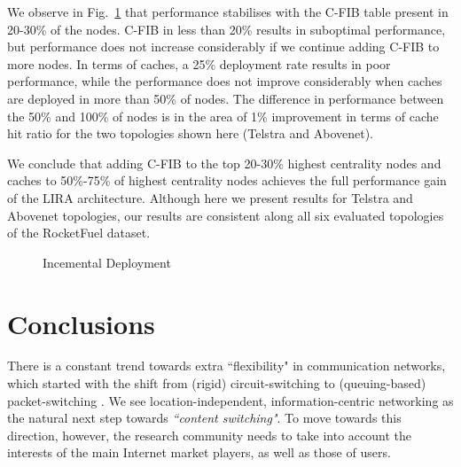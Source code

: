 \documentclass{sig-alternate}
\begin{document}
We observe in Fig.~\ref{fig:incremental-deployment} that performance stabilises with the C-FIB table present in 20-30\% of the nodes. C-FIB in less than 20\% results in suboptimal performance, but performance does not increase considerably if we continue adding C-FIB to more nodes. In terms of caches, a 25\% deployment rate results in poor performance, while the performance does not improve considerably when caches are deployed in more than 50\% of nodes. The difference in performance between the 50\% and 100\% of nodes is in the area of 1\% improvement in terms of cache hit ratio for the two topologies shown here (Telstra and Abovenet).


We conclude that adding C-FIB to the top 20-30\% highest centrality nodes and caches to 50\%-75\% of highest centrality nodes achieves the full performance gain of the LIRA architecture. Although here we present results for Telstra and Abovenet topologies, our results are consistent along all six evaluated topologies of the RocketFuel dataset.

\begin{figure}[h]
\centering
{}
\vspace{-0.1cm}
    	\caption{Incemental Deployment}
    	\label{fig:incremental-deployment}
\end{figure}





 


\makeatletter{}\section{Conclusions}\label{concl}

There is a constant trend towards extra ``flexibility" in communication networks, which started with the shift from (rigid) circuit-switching to (queuing-based) packet-switching \cite{kurose-icn}. We see location-independent, information-centric networking as the natural next step towards \textit{``content switching"}. To move towards this direction, however, the research community needs to take into account the interests of the main Internet market players, as well as those of users.
\end{document}
